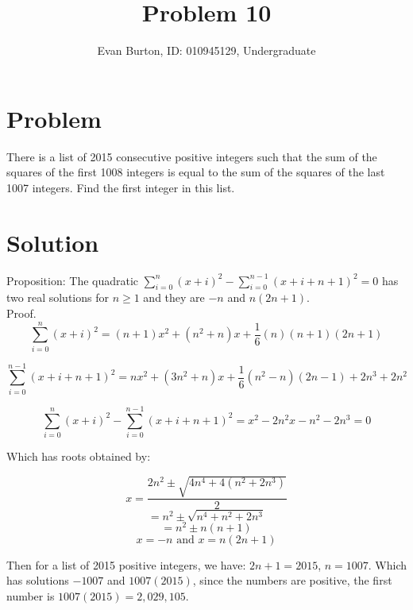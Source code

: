 \documentclass[]{article}
\title{Problem 10}
\author{Evan Burton, ID: 010945129,  Undergraduate}
\begin{document}
\maketitle

\section{Problem}
There is a list of 2015 consecutive positive integers such that the sum of the squares of the first 1008 integers is equal to the sum of the squares of the last 1007 integers.  Find the first integer in this list. 

\section{Solution}
Proposition: The quadratic $\displaystyle{\sum_{i=0}^{n}(x+i)^2 - \sum_{i=0}^{n-1}(x+i+n+1)^2} = 0$ has two real solutions for $n \geq 1$ and they are $-n$ and $n(2n+1)$.\\

Proof.\\
$$\displaystyle{\sum_{i=0}^{n}(x+i)^2} = (n+1)x^2+(n^2+n)x+\frac{1}{6}(n)(n+1)(2n+1)$$

$$\displaystyle{\sum_{i=0}^{n-1}(x+i+n+1)^2} = nx^2+(3n^2+n)x + \frac{1}{6}(n^2-n)(2n-1) + 2n^3 + 2n^2$$

$$\displaystyle{\sum_{i=0}^{n}(x+i)^2 - \sum_{i=0}^{n-1}(x+i+n+1)^2} = 
x^2 - 2n^2x-n^2-2n^3 = 0
$$

Which has roots obtained by:

$$x = \frac{2n^2\pm \sqrt{4n^4+4(n^2+2n^3)}}{2}$$
$$= {n^2\pm \sqrt{n^4+n^2+2n^3}}$$
$$= {n^2 \pm n(n+1)}$$
$$x = -n\text{ and } x = n(2n+1)$$

Then for a list of 2015 positive integers, we have: $2n+1 = 2015$, $n = 1007$. Which has solutions $-1007$ and $1007(2015)$, since the numbers are positive, the first number is $1007(2015) = 2,029,105$.
\end{document}
